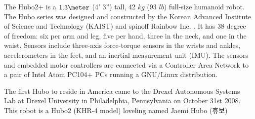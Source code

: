 The Hubo2+ is a $1.3\meter$ (4' 3'') tall, 42 $kg$ (93 $lb$) full-size
humanoid robot.  The Hubo series was designed and constructed by the
Korean Advanced Institute of Science and Technology (KAIST) and
spinoff Rainbow Inc. \cite{hubofirst}.  It has 38 degree of freedom:
six per arm and leg, five per hand, three in the neck, and one in the
waist.  Sensors include three-axis force-torque sensors in the wrists
and ankles, accelerometers in the feet, and an inertial measurement
unit (IMU).  The sensors and embedded motor controllers are connected
via a Controller Area Network to a pair of Intel Atom PC104+ PCs
running a GNU/Linux distribution.

The first Hubo to reside in America came to the Drexel Autonomous Systems Lab at Drexel University in Philadelphia, Pennsylvania on October 31st 2008.
This robot is a Hubo2 (KHR-4 model) loveling named Jaemi Hubo (휴보)




